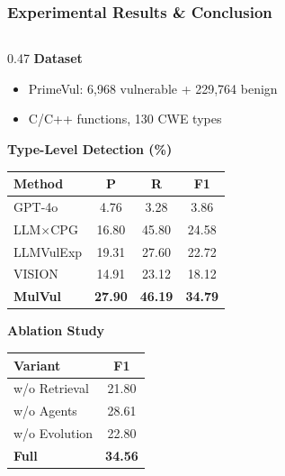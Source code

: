 \documentclass[aspectratio=169,10pt]{beamer}
\begin{document}
\begin{frame}
\frametitle{\small Experimental Results \& Conclusion}
\vspace{-0.2cm}
\begin{columns}[t]
\begin{column}{0.47\textwidth}
\textbf{\scriptsize Dataset}
\begin{itemize}\setlength{\itemsep}{0pt}
  \item[\scriptsize$\bullet$] {\scriptsize PrimeVul: 6,968 vulnerable + 229,764 benign}
  \item[\scriptsize$\bullet$] {\scriptsize C/C++ functions, 130 CWE types}
\end{itemize}

\vspace{0.08cm}
\textbf{\scriptsize Type-Level Detection (\%)}
\vspace{-0.05cm}
\begin{center}
{\scriptsize
\setlength{\tabcolsep}{3pt}
\begin{tabular}{@{}lccc@{}}
\toprule
\textbf{Method} & \textbf{P} & \textbf{R} & \textbf{F1} \\
\midrule
GPT-4o & 4.76 & 3.28 & 3.86 \\
LLM$\times$CPG & 16.80 & 45.80 & 24.58 \\
LLMVulExp & 19.31 & 27.60 & 22.72 \\
VISION & 14.91 & 23.12 & 18.12 \\
\textbf{MulVul} & \textbf{27.90} & \textbf{46.19} & \textbf{34.79} \\
\bottomrule
\end{tabular}
}
\end{center}

\vspace{0.08cm}
\textbf{\scriptsize Ablation Study}
\vspace{-0.05cm}
\begin{center}
{\scriptsize
\setlength{\tabcolsep}{4pt}
\begin{tabular}{@{}lc@{}}
\toprule
\textbf{Variant} & \textbf{F1} \\
\midrule
w/o Retrieval & 21.80 \\
w/o Agents & 28.61 \\
w/o Evolution & 22.80 \\
\textbf{Full} & \textbf{34.56} \\
\bottomrule
\end{tabular}
}
\end{center}
\end{column}


\end{columns}
\end{frame}
\end{document}
